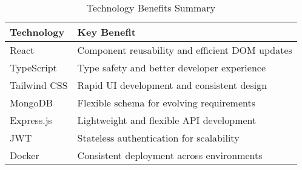 \begin{table}[h]
\centering
\begin{tabular}{|p{4cm}|p{9cm}|}
\hline
\textbf{Technology} & \textbf{Key Benefit} \\
\hline
React & Component reusability and efficient DOM updates \\
\hline
TypeScript & Type safety and better developer experience \\
\hline
Tailwind CSS & Rapid UI development and consistent design \\
\hline
MongoDB & Flexible schema for evolving requirements \\
\hline
Express.js & Lightweight and flexible API development \\
\hline
JWT & Stateless authentication for scalability \\
\hline
Docker & Consistent deployment across environments \\
\hline
\end{tabular}
\caption{Technology Benefits Summary}
\end{table}
